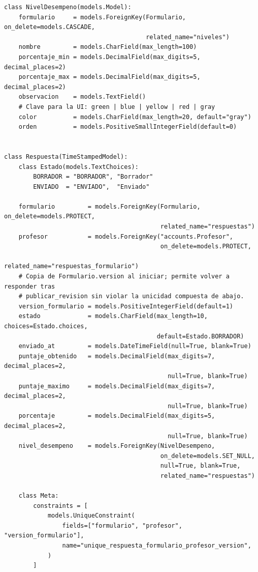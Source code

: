 \begin{lstlisting}[language={[3]Python}]
class NivelDesempeno(models.Model):
    formulario     = models.ForeignKey(Formulario, on_delete=models.CASCADE,
                                       related_name="niveles")
    nombre         = models.CharField(max_length=100)
    porcentaje_min = models.DecimalField(max_digits=5, decimal_places=2)
    porcentaje_max = models.DecimalField(max_digits=5, decimal_places=2)
    observacion    = models.TextField()
    # Clave para la UI: green | blue | yellow | red | gray
    color          = models.CharField(max_length=20, default="gray")
    orden          = models.PositiveSmallIntegerField(default=0)


class Respuesta(TimeStampedModel):
    class Estado(models.TextChoices):
        BORRADOR = "BORRADOR", "Borrador"
        ENVIADO  = "ENVIADO",  "Enviado"

    formulario         = models.ForeignKey(Formulario, on_delete=models.PROTECT,
                                           related_name="respuestas")
    profesor           = models.ForeignKey("accounts.Profesor",
                                           on_delete=models.PROTECT,
                                           related_name="respuestas_formulario")
    # Copia de Formulario.version al iniciar; permite volver a responder tras
    # publicar_revision sin violar la unicidad compuesta de abajo.
    version_formulario = models.PositiveIntegerField(default=1)
    estado             = models.CharField(max_length=10, choices=Estado.choices,
                                          default=Estado.BORRADOR)
    enviado_at         = models.DateTimeField(null=True, blank=True)
    puntaje_obtenido   = models.DecimalField(max_digits=7, decimal_places=2,
                                             null=True, blank=True)
    puntaje_maximo     = models.DecimalField(max_digits=7, decimal_places=2,
                                             null=True, blank=True)
    porcentaje         = models.DecimalField(max_digits=5, decimal_places=2,
                                             null=True, blank=True)
    nivel_desempeno    = models.ForeignKey(NivelDesempeno,
                                           on_delete=models.SET_NULL,
                                           null=True, blank=True,
                                           related_name="respuestas")

    class Meta:
        constraints = [
            models.UniqueConstraint(
                fields=["formulario", "profesor", "version_formulario"],
                name="unique_respuesta_formulario_profesor_version",
            )
        ]



\end{lstlisting}
